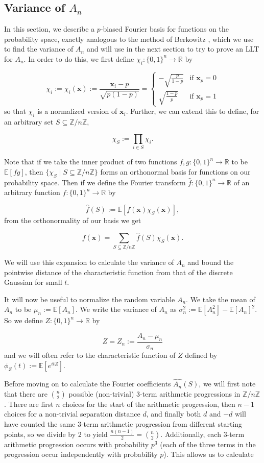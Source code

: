 \documentclass[12pt]{article} %
\newcommand{\E}{\mathbb{E}}
\newcommand{\bbr}{\mathbb{R}}
\newcommand{\Z}{\mathbb{Z}}
\newcommand{\bfx}{\mathbf{x}}
\theoremstyle{definition}
\theoremstyle{definition}
\begin{document}
\subsection{Variance of $A_n$}
In this section, we describe a $p$-biased Fourier basis for functions on the probability space, exactly analogous to the method of Berkowitz \cite{Berkowitz17}, which we use to find the variance of $A_n$ and will use in the next section to try to prove an LLT for $A_n.$
In order to do this, we first define $\chi_i : \{0,1\}^n \to \bbr$ by

\[\chi_i := \chi_i(\bfx) := \frac{\bfx_i - p}{\sqrt{p(1-p)}} = \begin{cases} 
      -\sqrt{\frac{p}{1-p}} & \text{if } \bfx_p = 0 \\[10pt]
      \sqrt{\frac{1-p}{p}} & \text{if } \bfx_p = 1
\end{cases} \]
so that $\chi_i$ is a normalized version of $\bfx_i$. Further, we can extend this to define, for an arbitrary set $S \subseteq \Z / n\Z$,

\[\chi_S := \prod_{i \in S} {\chi_i}. \]

Note that if we take the inner product of two functions $f, g : \{0,1\}^n \to \bbr$ to be $\E[fg]$, then $\{\chi_S \mid S \subseteq \Z / n\Z\}$ forms an orthonormal basis for functions on our probability space. Then if we define the Fourier transform $\hat{f} : \{0,1\}^n \to \bbr$ of an arbitrary function $f : \{0,1\}^n \to \bbr$ by

\[\hat{f}(S) := \E[f(\bfx)\chi_S(\bfx)],\]
from the orthonormality of our basis we get

\[ f(\bfx) = \sum_{S \subseteq \Z / n\Z} {\hat{f}(S)\chi_S(\bfx)}. \]

We will use this expansion to calculate the variance of $A_n$ and bound the pointwise distance of the characteristic function from that of the discrete Gaussian for small $t$.

It will now be useful to normalize the random variable $A_n$. We take the mean of $A_n$ to be $\mu_n := \E[A_n]$. We write the variance of $A_n$ as $\sigma_n^2 := \E[A_n^2] - \E[A_n]^2$. So we define $Z : \{0,1\}^n \to \bbr$ by

\[Z = Z_n := \frac{A_n - \mu_n}{\sigma_n}\]
and we will often refer to the characteristic function of $Z$ defined by $\phi_Z(t) := \E[e^{itZ}]$.

Before moving on to calculate the Fourier coefficients $\hat{A_n}(S)$, we will first note that there are $\binom{n}{2}$ possible (non-trivial) 3-term arithmetic progressions in $\Z / n\Z$. There are first $n$ choices for the start of the arithmetic progression, then $n-1$ choices for a non-trivial separation distance $d$, and finally both $d$ and $-d$ will have counted the same 3-term arithmetic progression from different starting points, so we divide by 2 to yield $\frac{n(n-1)}{2} = \binom{n}{2}$. Additionally, each 3-term arithmetic progression occurs with probability $p^3$ (each of the three terms in the progression occur independently with probability $p$). This allows us to calculate
\end{document}
